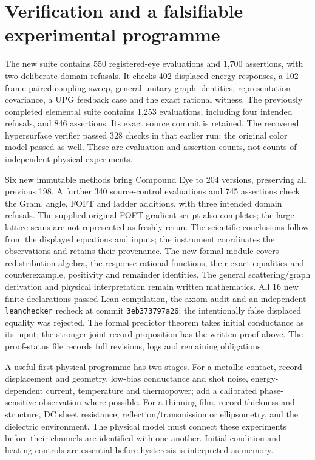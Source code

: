 \documentclass[11pt]{article}
\begin{document}
\section{Verification and a falsifiable experimental programme}
The new suite contains 550 registered-eye evaluations and 1,700 assertions, with two deliberate domain refusals. It checks 402 displaced-energy responses, a 102-frame paired coupling sweep, general unitary graph identities, representation covariance, a UPG feedback case and the exact rational witness. The previously completed elemental suite contains 1,253 evaluations, including four intended refusals, and 846 assertions. Its exact source commit is retained. The recovered hypersurface verifier passed 328 checks in that earlier run; the original color model passed as well. These are evaluation and assertion counts, not counts of independent physical experiments.

Six new immutable methods bring Compound Eye to 204 versions, preserving all previous 198. A further 340 source-control evaluations and 745 assertions check the Gram, angle, FOFT and ladder additions, with three intended domain refusals. The supplied original FOFT gradient script also completes; the large lattice scans are not represented as freshly rerun. The scientific conclusions follow from the displayed equations and inputs; the instrument coordinates the observations and retains their provenance. The new formal module covers redistribution algebra, the response rational functions, their exact equalities and counterexample, positivity and remainder identities. The general scattering/graph derivation and physical interpretation remain written mathematics. All 16 new finite declarations passed Lean compilation, the axiom audit and an independent \texttt{leanchecker} recheck at commit \texttt{3eb373797a26}; the intentionally false displaced equality was rejected. The formal predictor theorem takes initial conductance as its input; the stronger joint-record proposition has the written proof above. The proof-status file records full revisions, logs and remaining obligations.

A useful first physical programme has two stages. For a metallic contact, record displacement and geometry, low-bias conductance and shot noise, energy-dependent current, temperature and thermopower; add a calibrated phase-sensitive observation where possible. For a thinning film, record thickness and structure, DC sheet resistance, reflection/transmission or ellipsometry, and the dielectric environment. The physical model must connect these experiments before their channels are identified with one another. Initial-condition and heating controls are essential before hysteresis is interpreted as memory.
\end{document}
